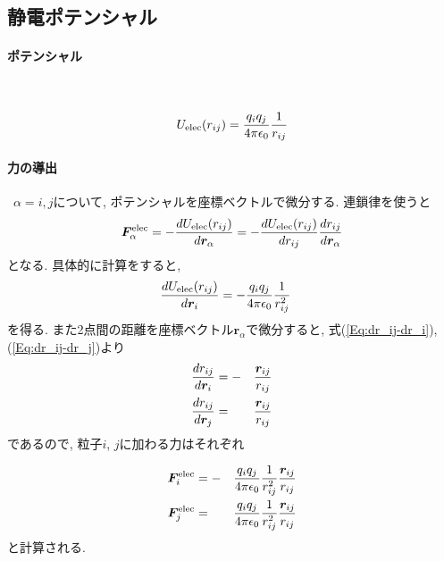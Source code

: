 \subsection{静電ポテンシャル}
\paragraph{ポテンシャル} \

\begin{equation}
U_{\mathrm{elec}}(r_{ij}) = \frac{q_{i}q_{j}}{4 \pi \epsilon_{0}}
                            \frac{1}{r_{ij}}
\notag
\end{equation}

\paragraph{力の導出} \
$\alpha = i, j$について, ポテンシャルを座標ベクトルで微分する. 連鎖律を使うと
\begin{equation}
   \bm{F}_{\alpha}^{\mathrm{elec}}
   =
   -
   \frac{d U_{\mathrm{elec}}(r_{ij})}{d \bm{r}_{\alpha}}
   =
   -
   \frac{d U_{\mathrm{elec}}(r_{ij})}{d r_{ij}}
   \frac{d r_{ij}}{d \bm{r}_{\alpha}}
   \notag
\end{equation}
となる. 具体的に計算をすると,
\begin{align}
   \frac{d U_{\mathrm{elec}}(r_{ij})}{d \bm{r}_{i}}
   &=
   -
   \frac{q_{i}q_{j}}{4 \pi \epsilon_{0}}
   \frac{1}{r_{ij}^{2}}
   \notag
\end{align}
を得る. また2点間の距離を座標ベクトル$\bm{r}_{\alpha}$で微分すると, 式(\ref{Eq:dr_ij-dr_i}), (\ref{Eq:dr_ij-dr_j})より
\begin{alignat}{3}
   \frac{d r_{ij}}{d \bm{r}_{i}}
   &=
   -&&
   \frac{\bm{r}_{ij}}{r_{ij}}
   \notag
   \\
   \frac{d r_{ij}}{d \bm{r}_{j}}
   &=&&
   \frac{\bm{r}_{ij}}{r_{ij}}
   \notag
\end{alignat}
であるので, 粒子$i$, $j$に加わる力はそれぞれ

\begin{alignat}{3}
   \bm{F}_{i}^{\mathrm{elec}}
   &=-&&
   \frac{q_{i}q_{j}}{4 \pi \epsilon_{0}}
   \frac{1}{r_{ij}^{2}}
   \frac{\bm{r}_{ij}}{r_{ij}}
   \notag
   \\
   \bm{F}_{j}^{\mathrm{elec}}
   &=&&
   \frac{q_{i}q_{j}}{4 \pi \epsilon_{0}}
   \frac{1}{r_{ij}^{2}}
   \frac{\bm{r}_{ij}}{r_{ij}}
   \notag
\end{alignat}
と計算される.
\\

